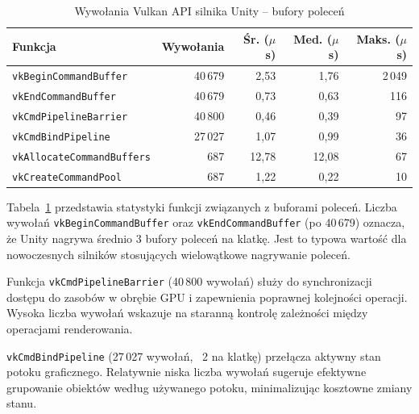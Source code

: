 \begin{table}[H]
\centering
\caption{Wywołania Vulkan API silnika Unity -- bufory poleceń}
\label{tab:unity-vulkan-cmd}
\small
\begin{tabular}{|l|r|r|r|r|}
\hline
\textbf{Funkcja} & \textbf{Wywołania} & \textbf{Śr. ($\mu$s)} & \textbf{Med. ($\mu$s)} & \textbf{Maks. ($\mu$s)} \\
\hline
\texttt{vkBeginCommandBuffer} & 40\,679 & 2,53 & 1,76 & 2\,049 \\
\texttt{vkEndCommandBuffer} & 40\,679 & 0,73 & 0,63 & 116 \\
\texttt{vkCmdPipelineBarrier} & 40\,800 & 0,46 & 0,39 & 97 \\
\texttt{vkCmdBindPipeline} & 27\,027 & 1,07 & 0,99 & 36 \\
\texttt{vkAllocateCommandBuffers} & 687 & 12,78 & 12,08 & 67 \\
\texttt{vkCreateCommandPool} & 687 & 1,22 & 0,22 & 10 \\
\hline
\end{tabular}
\end{table}


Tabela~\ref{tab:unity-vulkan-cmd} przedstawia statystyki funkcji związanych z buforami poleceń. 
Liczba wywołań \texttt{vkBeginCommandBuffer} oraz 
\texttt{vkEndCommandBuffer} (po 40\,679) oznacza, że Unity nagrywa średnio 3 bufory poleceń na klatkę. Jest to typowa wartość dla nowoczesnych 
silników stosujących wielowątkowe nagrywanie poleceń.

Funkcja \texttt{vkCmdPipelineBarrier} (40\,800 wywołań) służy do synchronizacji dostępu do zasobów w obrębie GPU i zapewnienia poprawnej kolejności 
operacji. Wysoka liczba wywołań wskazuje na staranną kontrolę zależności między operacjami renderowania.

\texttt{vkCmdBindPipeline} (27\,027 wywołań, ~2 na klatkę) przełącza aktywny stan potoku graficznego. Relatywnie niska liczba wywołań sugeruje efektywne 
grupowanie obiektów według używanego potoku, minimalizując kosztowne zmiany stanu.


